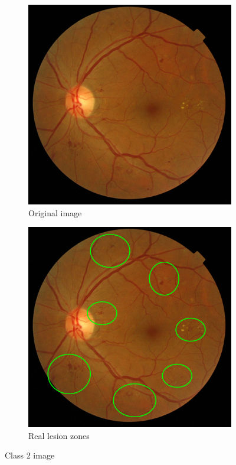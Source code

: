 \documentclass[review]{elsarticle}
\theoremstyle{definition} %
\theoremstyle{remark}
\begin{document}
\begin{figure}[h!]
	\centering
	\begin{subfigure}[b]{0.28\textwidth}
		\centering
		\includegraphics[width=\textwidth]{./figures/ica_retine_maps/G2-P3/g2.png}
		\caption{Original image}	
	\end{subfigure}
	\begin{subfigure}[b]{0.28\textwidth}
		\centering
		\includegraphics[width=\textwidth]{./figures/ica_retine_maps/G2-P3/metge.png}
		\caption{Real lesion zones}	
	\end{subfigure}
	\hfill 
	\caption{Class 2 image}  
	\label{fig:ica_components_class2_from} 
\end{figure}
\end{document}
